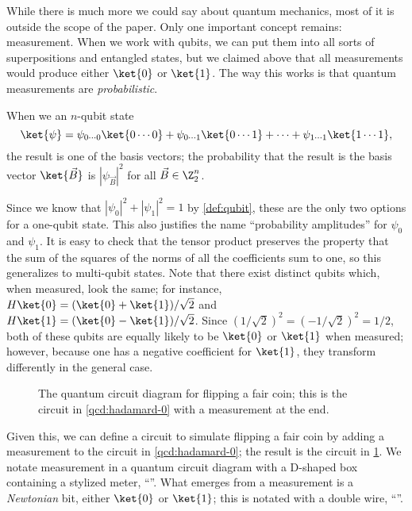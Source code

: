 While there is much more we could say about quantum mechanics, most of it is
outside the scope of the paper.  Only one important concept remains:
measurement.  When we work with qubits, we can put them into all sorts of
superpositions and entangled states, but we claimed above that all measurements
would produce either $\ket{0}$ or $\ket{1}$.  The way this works is that quantum
measurements are \emph{probabilistic}.

\begin{definition}[Measurement]\label{def:single-qubit-measurement}
  When we  an $n$-qubit state \[
    \ket{\psi} = \psi_{0\cdots0}\ket{0\cdots0}
               + \psi_{0\cdots1}\ket{0\cdots1}
               + \cdots
               + \psi_{1\cdots1}\ket{1\cdots1},
  \] the result is one of the basis vectors; the probability that the result is
  the basis vector $\ket{\vec{B}}$ is $|\psi_{\vec{B}}|^2$ for all $\vec{B} \in
  \Z_2^n$.
\end{definition}

Since we know that $|\psi_0|^2 + |\psi_1|^2 = 1$ by \cref{def:qubit}, these are
the only two options for a one-qubit state.  This also justifies the name
``probability amplitudes'' for $\psi_0$ and $\psi_1$.  It is easy to check that
the tensor product preserves the property that the sum of the squares of the
norms of all the coefficients sum to one, so this generalizes to multi-qubit
states.  Note that there exist distinct qubits which, when measured, look the
same; for instance, $H\ket{0} = (\ket{0} + \ket{1})/\sqrt{2}$ and $H\ket{1} =
(\ket{0} - \ket{1})/\sqrt{2}$.  Since $(1/\sqrt{2})^2 = (-1/\sqrt{2})^2 = 1/2$,
both of these qubits are equally likely to be $\ket{0}$ or $\ket{1}$ when
measured; however, because one has a negative coefficient for $\ket{1}$, they
transform differently in the general case.

\begin{figure}
  \centerline{}
  \caption{The quantum circuit diagram for flipping a fair coin; this is the
    circuit in \cref{qcd:hadamard-0} with a measurement at the end.}
  \label{qcd:fair-coin}
\end{figure}

Given this, we can define a circuit to simulate flipping a fair coin by adding a
measurement to the circuit in \cref{qcd:hadamard-0}; the result is the circuit
in \cref{qcd:fair-coin}.  We notate measurement in a quantum circuit diagram
with a \textsf{D}-shaped box containing a stylized meter, ``\metersym''.  What
emerges from a measurement is a \emph{Newtonian} bit, either $\ket{0}$ or
$\ket{1}$; this is notated with a double wire,
``\QcircuitDemo{&\cw}''.

